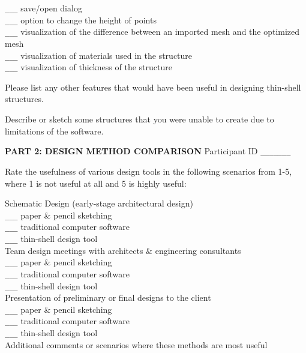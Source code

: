\documentclass{thesis}
\begin{document}
\verb+___+ save/open dialog\\
\verb+___+ option to change the height of points\\
\verb+___+ visualization of the difference between an imported mesh and the optimized mesh\\
\verb+___+ visualization of materials used in the structure\\
\verb+___+ visualization of thickness of the structure


\vspace{0.3in}

Please list any other features that would have been useful in designing thin-shell structures.
\vspace{1.2in}




Describe or sketch some structures that you were unable to create due to limitations of the software.
\vspace{1in}



\newpage
{\bf PART 2: DESIGN METHOD COMPARISON} 
\hfill Participant ID \verb+_______+
\vspace{0.3in}

Rate the usefulness of various design tools in the following scenarios from 1-5,
where 1 is not useful at all and 5 is highly useful:


Schematic Design (early-stage architectural design)\\
\verb+___+ paper \& pencil sketching \\
\verb+___+ traditional computer software \\
\verb+___+ thin-shell design tool \\
Team design meetings with architects \& engineering consultants\\
\verb+___+ paper \& pencil sketching \\
\verb+___+ traditional computer software \\
\verb+___+ thin-shell design tool \\
Presentation of preliminary or final designs to the client\\
\verb+___+ paper \& pencil sketching \\
\verb+___+ traditional computer software \\
\verb+___+ thin-shell design tool \\


Additional comments or scenarios where these methods are most useful
\vspace{0.15in}
\end{document}
